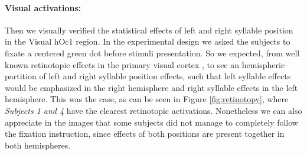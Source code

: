 \paragraph{Visual activations:}
Then we visually verified the statistical effects of left and right syllable position in the Visual hOc1 region.
In the experimental design we asked the subjects to fixate a centered green dot before stimuli presentation.
So we expected, from well known retinotopic effects in the primary visual cortex \citep{tootell1998retinotopy}, to see an hemispheric partition of left and right syllable position effects, such that left syllable effects would be emphasized in the right hemisphere and right syllable effects in the left hemisphere.
This was the case, as can be seen in Figure \ref{fig:retinotopy}, where \emph{Subjects 1 and 4} have the clearest retinotopic activations.
Nonetheless we can also appreciate in the images that some subjects did not manage to completely follow the fixation instruction, since effects of both positions are present together in both hemispheres.


